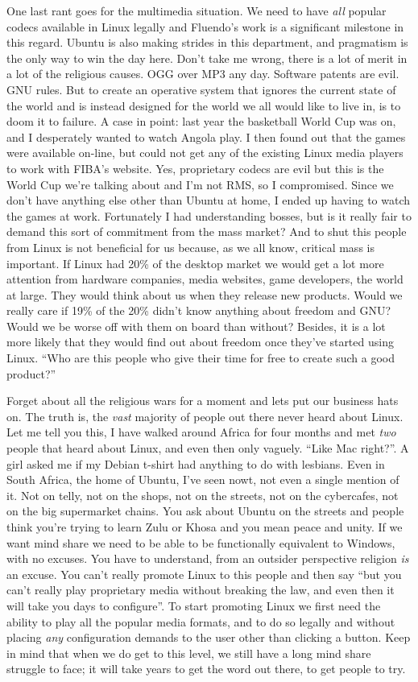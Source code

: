 \documentclass{book}
\begin{document}
One last rant goes for the multimedia situation. We need to have
\emph{all} popular codecs available in Linux legally and Fluendo's
work is a significant milestone in this regard. Ubuntu is also making
strides in this department, and pragmatism is the only way to win the
day here. Don't take me wrong, there is a lot of merit in a lot of the
religious causes. OGG over MP3 any day. Software patents are evil. GNU
rules. But to create an operative system that ignores the current
state of the world and is instead designed for the world we all would
like to live in, is to doom it to failure. A case in point: last year
the basketball World Cup was on, and I desperately wanted to watch
Angola play. I then found out that the games were available on-line,
but could not get any of the existing Linux media players to work with
FIBA's website. Yes, proprietary codecs are evil but this is the World
Cup we're talking about and I'm not RMS, so I compromised. Since we
don't have anything else other than Ubuntu at home, I ended up having
to watch the games at work. Fortunately I had understanding bosses,
but is it really fair to demand this sort of commitment from the mass
market? And to shut this people from Linux is not beneficial for us
because, as we all know, critical mass is important. If Linux had 20\%
of the desktop market we would get a lot more attention from hardware
companies, media websites, game developers, the world at large. They
would think about us when they release new products. Would we really
care if 19\% of the 20\% didn't know anything about freedom and GNU?
Would we be worse off with them on board than without? Besides, it is
a lot more likely that they would find out about freedom once they've
started using Linux. ``Who are this people who give their time for free
to create such a good product?''

Forget about all the religious wars for a moment and lets put our
business hats on. The truth is, the \emph{vast} majority of people out
there never heard about Linux. Let me tell you this, I have walked
around Africa for four months and met \emph{two} people that heard
about Linux, and even then only vaguely. ``Like Mac right?''. A girl
asked me if my Debian t-shirt had anything to do with lesbians. Even
in South Africa, the home of Ubuntu, I've seen nowt, not even a single
mention of it. Not on telly, not on the shops, not on the streets, not
on the cybercafes, not on the big supermarket chains. You ask about
Ubuntu on the streets and people think you're trying to learn Zulu or
Khosa and you mean peace and unity. If we want mind share we need to
be able to be functionally equivalent to Windows, with no excuses. You
have to understand, from an outsider perspective religion \emph{is} an
excuse. You can't really promote Linux to this people and then say
``but you can't really play proprietary media without breaking the law,
and even then it will take you days to configure''. To start promoting
Linux we first need the ability to play all the popular media formats,
and to do so legally and without placing \emph{any} configuration
demands to the user other than clicking a button. Keep in mind that
when we do get to this level, we still have a long mind share struggle
to face; it will take years to get the word out there, to get people
to try.
\end{document}
